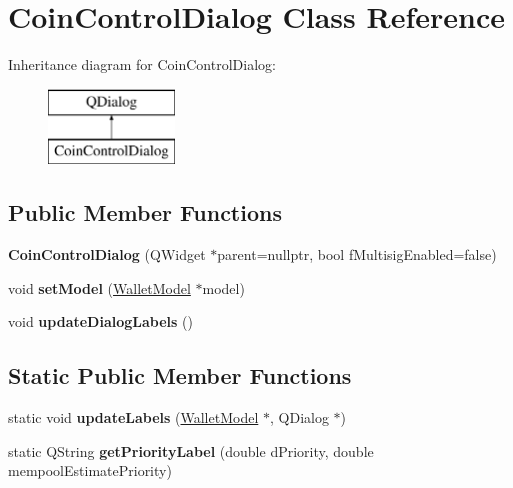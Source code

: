 \hypertarget{class_coin_control_dialog}{}\section{Coin\+Control\+Dialog Class Reference}
\label{class_coin_control_dialog}
Inheritance diagram for Coin\+Control\+Dialog\+:\begin{figure}[H]
\begin{center}
\leavevmode
\includegraphics[height=2.000000cm]{class_coin_control_dialog}
\end{center}
\end{figure}
\subsection*{Public Member Functions}
\begin{DoxyCompactItemize}
\item 
\mbox{\label{class_coin_control_dialog_a8eafb58ed1c5668af9a4890704136671}} 
{\bfseries Coin\+Control\+Dialog} (Q\+Widget $\ast$parent=nullptr, bool f\+Multisig\+Enabled=false)
\item 
\mbox{\label{class_coin_control_dialog_a4c34a48574814089c54f763a22f5317a}} 
void {\bfseries set\+Model} (\mbox{\hyperlink{class_wallet_model}{Wallet\+Model}} $\ast$model)
\item 
\mbox{\label{class_coin_control_dialog_ae0162e01893a3c85aeeee743c1cb1084}} 
void {\bfseries update\+Dialog\+Labels} ()
\end{DoxyCompactItemize}
\subsection*{Static Public Member Functions}
\begin{DoxyCompactItemize}
\item 
\mbox{\label{class_coin_control_dialog_a4fc60e89b097952ff22dc0f9c58c87d9}} 
static void {\bfseries update\+Labels} (\mbox{\hyperlink{class_wallet_model}{Wallet\+Model}} $\ast$, Q\+Dialog $\ast$)
\item 
\mbox{\label{class_coin_control_dialog_a82c553c068d383edb52e2c239642d8e4}} 
static Q\+String {\bfseries get\+Priority\+Label} (double d\+Priority, double mempool\+Estimate\+Priority)
\end{DoxyCompactItemize}
